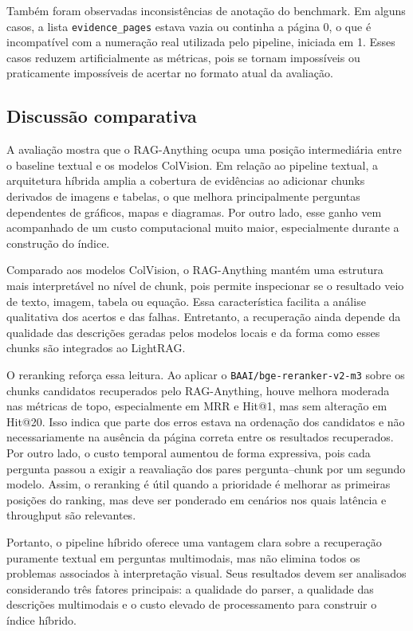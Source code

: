 Também foram observadas inconsistências de anotação do benchmark. Em alguns casos, a lista \texttt{evidence\_pages} estava vazia ou continha a página 0, o que é incompatível com a numeração real utilizada pelo pipeline, iniciada em 1. Esses casos reduzem artificialmente as métricas, pois se tornam impossíveis ou praticamente impossíveis de acertar no formato atual da avaliação.

\subsection{Discussão comparativa}
\label{subsec:raganything-discussao-comparativa}

A avaliação mostra que o RAG-Anything ocupa uma posição intermediária entre o baseline textual e os modelos ColVision. Em relação ao pipeline textual, a arquitetura híbrida amplia a cobertura de evidências ao adicionar chunks derivados de imagens e tabelas, o que melhora principalmente perguntas dependentes de gráficos, mapas e diagramas. Por outro lado, esse ganho vem acompanhado de um custo computacional muito maior, especialmente durante a construção do índice.

Comparado aos modelos ColVision, o RAG-Anything mantém uma estrutura mais interpretável no nível de chunk, pois permite inspecionar se o resultado veio de texto, imagem, tabela ou equação. Essa característica facilita a análise qualitativa dos acertos e das falhas. Entretanto, a recuperação ainda depende da qualidade das descrições geradas pelos modelos locais e da forma como esses chunks são integrados ao LightRAG.

O reranking reforça essa leitura. Ao aplicar o \texttt{BAAI/bge-reranker-v2-m3} sobre os chunks candidatos recuperados pelo RAG-Anything, houve melhora moderada nas métricas de topo, especialmente em MRR e Hit@1, mas sem alteração em Hit@20. Isso indica que parte dos erros estava na ordenação dos candidatos e não necessariamente na ausência da página correta entre os resultados recuperados. Por outro lado, o custo temporal aumentou de forma expressiva, pois cada pergunta passou a exigir a reavaliação dos pares pergunta--chunk por um segundo modelo. Assim, o reranking é útil quando a prioridade é melhorar as primeiras posições do ranking, mas deve ser ponderado em cenários nos quais latência e throughput são relevantes.

Portanto, o pipeline híbrido oferece uma vantagem clara sobre a recuperação puramente textual em perguntas multimodais, mas não elimina todos os problemas associados à interpretação visual. Seus resultados devem ser analisados considerando três fatores principais: a qualidade do parser, a qualidade das descrições multimodais e o custo elevado de processamento para construir o índice híbrido.

